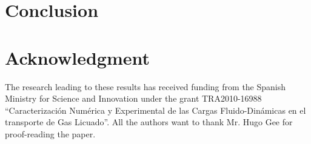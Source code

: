 \documentclass[a4paper,conference]{IEEEtran}
\begin{document}
\section{Conclusion}



\section*{Acknowledgment}
The research  leading  to these results has received funding from the Spanish Ministry for Science and
 Innovation under the grant TRA2010-16988
``Caracterizaci\'on Num\'erica y Experimental de las Cargas Fluido-Din\'amicas en el transporte de Gas Licuado''.
All the authors want to thank Mr. Hugo Gee for proof-reading the paper.




% 
% 
% 
% 
% 
% 
% 
% 
% 
% 
% 
% 
% 


\end{document}
